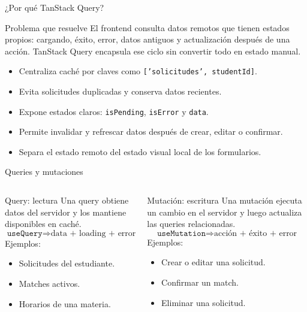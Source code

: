 \documentclass[aspectratio=169,11pt]{beamer}
\begin{document}
\begin{frame}{¿Por qué TanStack Query?}
  \begin{block}{Problema que resuelve}
    El frontend consulta datos remotos que tienen estados propios: cargando,
    éxito, error, datos antiguos y actualización después de una acción.
    TanStack Query encapsula ese ciclo sin convertir todo en estado manual.
  \end{block}
  \begin{itemize}
    \item Centraliza caché por claves como \texttt{['solicitudes', studentId]}.
    \item Evita solicitudes duplicadas y conserva datos recientes.
    \item Expone estados claros: \texttt{isPending}, \texttt{isError} y \texttt{data}.
    \item Permite invalidar y refrescar datos después de crear, editar o confirmar.
    \item Separa el estado remoto del estado visual local de los formularios.
  \end{itemize}
\end{frame}

\begin{frame}{Queries y mutaciones}
  \begin{columns}[T]
      \begin{block}{Query: lectura}
        Una query obtiene datos del servidor y los mantiene disponibles en caché.
        \[
          \texttt{useQuery} \Rightarrow
          \text{data + loading + error}
        \]
        \vspace{-0.1cm}
        Ejemplos:
        \begin{itemize}
          \item Solicitudes del estudiante.
          \item Matches activos.
          \item Horarios de una materia.
        \end{itemize}
      \end{block}
      \begin{block}{Mutación: escritura}
        Una mutación ejecuta un cambio en el servidor y luego actualiza las
        queries relacionadas.
        \[
          \texttt{useMutation} \Rightarrow
          \text{acción + éxito + error}
        \]
        \vspace{-0.1cm}
        Ejemplos:
        \begin{itemize}
          \item Crear o editar una solicitud.
          \item Confirmar un match.
          \item Eliminar una solicitud.
        \end{itemize}
      \end{block}
  \end{columns}
\end{frame}
\end{document}
